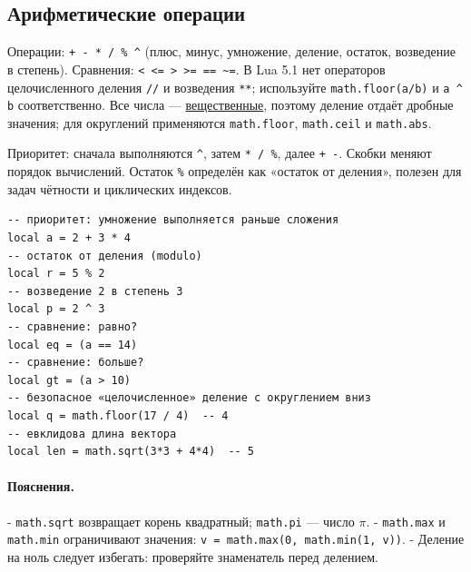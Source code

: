 \subsection{Арифметические операции}
Операции: \verb|+ - * / % ^| (плюс, минус, умножение, деление, остаток, возведение в степень). Сравнения: \verb|< <= > >= == ~=|. В Lua 5.1 нет операторов целочисленного деления \verb|//| и возведения \verb|**|; используйте \verb|math.floor(a/b)| и \verb|a ^ b| соответственно. Все числа — \hyperlink{term:number}{вещественные}, поэтому деление отдаёт дробные значения; для округлений применяются \verb|math.floor|, \verb|math.ceil| и \verb|math.abs|.

Приоритет: сначала выполняются \verb|^|, затем \verb|* / %|, далее \verb|+ -|. Скобки меняют порядок вычислений. Остаток \verb|%| определён как «остаток от деления», полезен для задач чётности и циклических индексов.
\begin{verbatim}
-- приоритет: умножение выполняется раньше сложения
local a = 2 + 3 * 4
-- остаток от деления (modulo)
local r = 5 % 2
-- возведение 2 в степень 3
local p = 2 ^ 3
-- сравнение: равно?
local eq = (a == 14)
-- сравнение: больше?
local gt = (a > 10)
-- безопасное «целочисленное» деление с округлением вниз
local q = math.floor(17 / 4)  -- 4
-- евклидова длина вектора
local len = math.sqrt(3*3 + 4*4)  -- 5
\end{verbatim}
\paragraph{Пояснения.}
- \verb|math.sqrt| возвращает корень квадратный; \verb|math.pi| — число $\pi$.
- \verb|math.max| и \verb|math.min| ограничивают значения: \verb|v = math.max(0, math.min(1, v))|.
- Деление на ноль следует избегать: проверяйте знаменатель перед делением.
